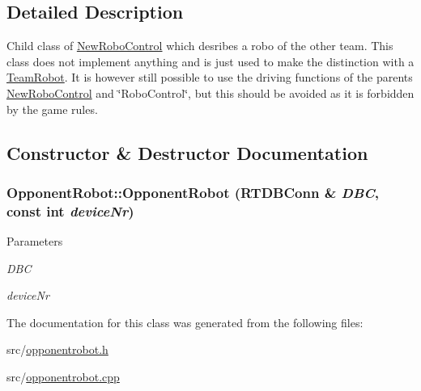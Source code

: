 \subsection{Detailed Description}
Child class of \hyperlink{classNewRoboControl}{NewRoboControl} which desribes a robo of the other team. This class does not implement anything and is just used to make the distinction with a \hyperlink{classTeamRobot}{TeamRobot}. It is however still possible to use the driving functions of the parents \hyperlink{classNewRoboControl}{NewRoboControl} and \char`\"{}RoboControl\char`\"{}, but this should be avoided as it is forbidden by the game rules. 

\subsection{Constructor \& Destructor Documentation}
\hypertarget{classOpponentRobot_a315c08a9f17d278b1bb8067929b38f83}{
\subsubsection[{OpponentRobot}]{\setlength{\rightskip}{0pt plus 5cm}OpponentRobot::OpponentRobot (RTDBConn \& {\em DBC}, \/  const int {\em deviceNr})}}
\label{classOpponentRobot_a315c08a9f17d278b1bb8067929b38f83}

\begin{DoxyParams}{Parameters}
\item[{\em DBC}]\item[{\em deviceNr}]\end{DoxyParams}


The documentation for this class was generated from the following files:\begin{DoxyCompactItemize}
\item 
src/\hyperlink{opponentrobot_8h}{opponentrobot.h}\item 
src/\hyperlink{opponentrobot_8cpp}{opponentrobot.cpp}\end{DoxyCompactItemize}
